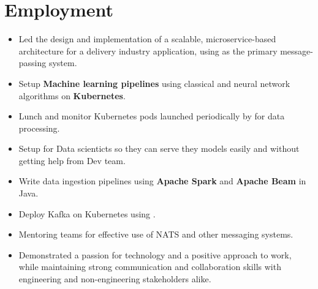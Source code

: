 \section{Employment}

\vspace{0.5cm}
\begin{itemize}
  \item Led the design and implementation of a scalable, microservice-based architecture for a delivery industry application,
    using  as the primary message-passing system.
  \item Setup \textbf{Machine learning pipelines} using classical and neural network algorithms on \textbf{Kubernetes}.
  \item Lunch and monitor Kubernetes pods launched periodically by  for data processing.
  \item Setup  for Data scienticts so they can serve they models easily and without getting help from Dev team.
  \item Write data ingestion pipelines using \textbf{Apache Spark} and \textbf{Apache Beam} in Java.
  \item Deploy Kafka on Kubernetes using .
  \item Mentoring teams for effective use of NATS and other messaging systems.
  \item Demonstrated a passion for technology and a positive approach to work,
    while maintaining strong communication and collaboration skills with engineering
    and non-engineering stakeholders alike.
\end{itemize}

\vspace{1cm}

